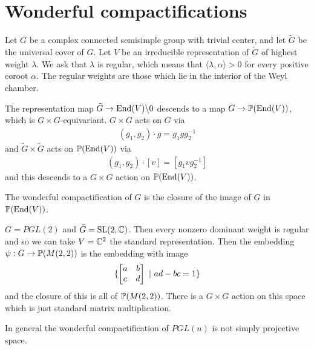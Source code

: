 \documentclass[12pt]{article}
\begin{document}
\section{Wonderful compactifications}
Let $G$ be a complex connected semisimple group with trivial center, and let $\tilde G$ be
the universal cover of $G$. Let $V$ be an irreducible representation of $\tilde G$ 
of highest weight $\lambda$. We ask that $\lambda$ is regular, which means that $\langle \lambda, \alpha\rangle > 0$ for every
positive coroot $\alpha$. The regular weights are those which lie in the interior of the Weyl chamber.

The representation map $\tilde G\to \End(V)\backslash 0$ 
descends to a map $G \to \P(\End(V))$, which is $G\times G$-equivariant. $G\times G$ acts on $G$ via \begin{align*}
    (g_1,g_2)\cdot g = g_1gg_2^{-1}
\end{align*} and $\tilde G\times \tilde G$ acts on $\P(\End(V))$ via \begin{align*}
    (g_1,g_2)\cdot [v] = [g_1vg_2^{-1}]
\end{align*} and this descends to a $G\times G$ action on $\P(\End(V))$. 

\begin{definition}
    The wonderful compactification of $G$ is the closure of the image of $G$ in $\P(\End(V))$. 
\end{definition} 

\begin{example}
    $G = PGL(2)$ and $\tilde G = \SL(2,\C)$. Then every nonzero dominant weight is regular and so we can
    take $V = \C^2$ the standard representation. Then the embedding $\psi:G\to\P(M(2,2))$
    is the embedding with image \begin{align*}
        \set{\begin{bmatrix}
            a & b \\
            c & d
            \end{bmatrix}\st ad - bc = 1} 
    \end{align*} and the closure of this is all of $\P(M(2,2))$. There is a $G\times G$ action on this space 
    which is just standard matrix multiplication.
\end{example}

\begin{remark}
    In general the wonderful compactification of $PGL(n)$ is not simply projective space.
\end{remark}
\end{document}
